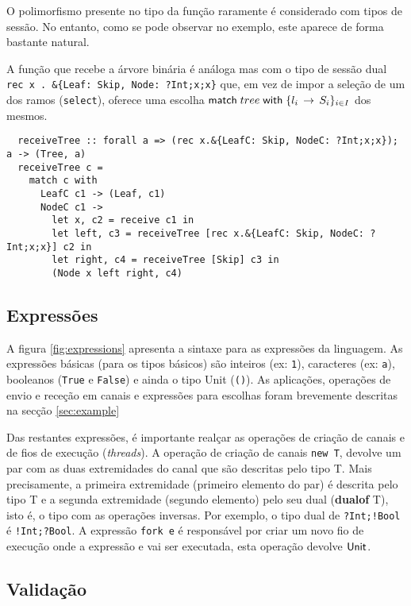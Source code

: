 O polimorfismo presente no tipo da função raramente é considerado com tipos de sessão. No entanto, como se pode observar no exemplo, este aparece de forma bastante natural.%

A função que recebe a árvore binária é análoga mas com o tipo de sessão dual \lstinline"rec x . &{Leaf: Skip, Node: ?Int;x;x}" que, em vez de impor a seleção de um dos ramos (\lstinline"select"), oferece uma escolha $\mathsf{match}\;tree\;\mathsf{with}\;\{l_i\,\to\,S_i\}_{i\in I}$ dos mesmos.
\begin{lstlisting}
  receiveTree :: forall a => (rec x.&{LeafC: Skip, NodeC: ?Int;x;x}); a -> (Tree, a)
  receiveTree c =
    match c with
      LeafC c1 -> (Leaf, c1)
      NodeC c1 ->
        let x, c2 = receive c1 in
        let left, c3 = receiveTree [rec x.&{LeafC: Skip, NodeC: ?Int;x;x}] c2 in
        let right, c4 = receiveTree [Skip] c3 in
        (Node x left right, c4)
\end{lstlisting}


\subsection{Expressões}
A figura \ref{fig:expressions} apresenta a sintaxe para as expressões da linguagem. As expressões básicas (para os tipos básicos) são inteiros (ex: \lstinline"1"), caracteres (ex: \lstinline"a"), booleanos (\lstinline"True" e \lstinline"False") e ainda o tipo Unit (\lstinline|()|).
As aplicações, operações de envio e receção em canais e expressões para escolhas foram brevemente descritas na secção \ref{sec:example}

Das restantes expressões, é importante realçar as operações de criação de canais e de fios de execução (\textit{threads}).
A operação de criação de canais \lstinline"new T", devolve um par com as duas extremidades do canal que são descritas pelo tipo T. Mais precisamente, a primeira extremidade (primeiro elemento do par) é descrita pelo tipo T e a segunda extremidade (segundo elemento) pelo seu dual (\textbf{dualof} T), isto é, o tipo com as operações inversas. Por exemplo, o tipo dual de \lstinline|?Int;!Bool| é \lstinline|!Int;?Bool|.
A expressão \lstinline"fork e" é responsável por criar um novo fio de execução onde a expressão e vai ser executada, esta operação devolve $\mathsf{Unit}$.


\subsection{Validação}

